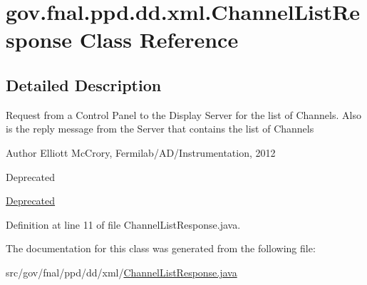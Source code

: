 \hypertarget{classgov_1_1fnal_1_1ppd_1_1dd_1_1xml_1_1ChannelListResponse}{\section{gov.\-fnal.\-ppd.\-dd.\-xml.\-Channel\-List\-Response Class Reference}
\label{classgov_1_1fnal_1_1ppd_1_1dd_1_1xml_1_1ChannelListResponse}
}


\subsection{Detailed Description}
Request from a Control Panel to the Display Server for the list of Channels. Also is the reply message from the Server that contains the list of Channels

\begin{DoxyAuthor}{Author}
Elliott Mc\-Crory, Fermilab/\-A\-D/\-Instrumentation, 2012 
\end{DoxyAuthor}
\begin{DoxyRefDesc}{Deprecated}
\item[\hyperlink{deprecated__deprecated000012}{Deprecated}]\end{DoxyRefDesc}


Definition at line 11 of file Channel\-List\-Response.\-java.



The documentation for this class was generated from the following file\-:\begin{DoxyCompactItemize}
\item 
src/gov/fnal/ppd/dd/xml/\hyperlink{ChannelListResponse_8java}{Channel\-List\-Response.\-java}\end{DoxyCompactItemize}
